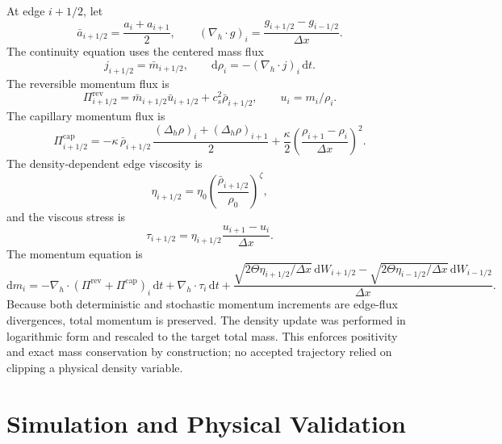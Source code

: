 \documentclass[11pt]{article}
\newcommand{\dd}{\mathrm{d}}
\newcommand{\Div}{\nabla_h\!\cdot}
\begin{document}
At edge \(i+1/2\), let
\begin{equation}
    \bar a_{i+1/2}=\frac{a_i+a_{i+1}}{2},
    \qquad
    (\Div g)_i=\frac{g_{i+1/2}-g_{i-1/2}}{\Delta x}.
\end{equation}
The continuity equation uses the centered mass flux
\begin{equation}
    j_{i+1/2}=\bar m_{i+1/2},
    \qquad
    \dd\rho_i=-(\Div j)_i\,\dd t .
\end{equation}
The reversible momentum flux is
\begin{equation}
    \Pi^{\mathrm{rev}}_{i+1/2}
    =
    \bar m_{i+1/2}\bar u_{i+1/2}
    +
    c_s^2\bar\rho_{i+1/2},
    \qquad
    u_i=m_i/\rho_i.
\end{equation}
The capillary momentum flux is
\begin{equation}
    \Pi^{\mathrm{cap}}_{i+1/2}
    =
    -\kappa\,\bar\rho_{i+1/2}\,
    \frac{(\Delta_h\rho)_i+(\Delta_h\rho)_{i+1}}{2}
    +
    \frac{\kappa}{2}
    \left(
        \frac{\rho_{i+1}-\rho_i}{\Delta x}
    \right)^2 .
\end{equation}
The density-dependent edge viscosity is
\begin{equation}
    \eta_{i+1/2}
    =
    \eta_0
    \left(
        \frac{\bar\rho_{i+1/2}}{\rho_0}
    \right)^\zeta,
\end{equation}
and the viscous stress is
\begin{equation}
    \tau_{i+1/2}
    =
    \eta_{i+1/2}
    \frac{u_{i+1}-u_i}{\Delta x}.
\end{equation}
The momentum equation is
\begin{equation}
    \dd m_i
    =
    -\Div(\Pi^{\mathrm{rev}}+\Pi^{\mathrm{cap}})_i\,\dd t
    +
    \Div \tau_i\,\dd t
    +
    \frac{\sqrt{2\Theta\eta_{i+1/2}/\Delta x}\,\dd W_{i+1/2}
    -
    \sqrt{2\Theta\eta_{i-1/2}/\Delta x}\,\dd W_{i-1/2}}{\Delta x}.
    \label{eq:momentum_sde}
\end{equation}
Because both deterministic and stochastic momentum increments are edge-flux divergences, total momentum is preserved.  The density update was performed in logarithmic form and rescaled to the target total mass.  This enforces positivity and exact mass conservation by construction; no accepted trajectory relied on clipping a physical density variable.

\section{Simulation and Physical Validation}
\end{document}
